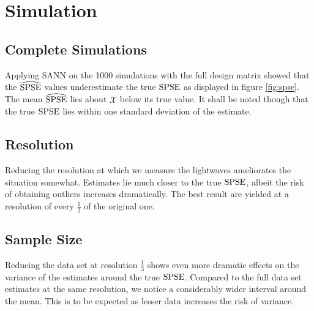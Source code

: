 \section{Simulation}
\label{sec:simulation}
	
	
	
	\subsection{Complete Simulations}
	\label{ssec:comp-sim}
	
		Applying SANN on the 1000 simulations with the full design matrix showed that the $\widehat{\mathrm{SPSE}}$ values underestimate the true $\mathrm{SPSE}$ as displayed in figure \ref{fig:spse}.
		The mean $\widehat{\mathrm{SPSE}}$ lies about $\mathcal{X}$ below its true value.
		It shall be noted though that the true $\mathrm{SPSE}$ lies within one standard deviation of the estimate.
	
	
	\subsection{Resolution}
	\label{ssec:resolution}
	
		Reducing the resolution at which we measure the lightwaves ameliorates the situation somewhat.
		Estimates lie much closer to the true $\mathrm{SPSE}$, albeit the risk of obtaining outliers increases dramatically.
		The best result are yielded at a resolution of every $\frac{1}{2}$ of the original one.
	
	
	\subsection{Sample Size}
	\label{ssec:samp-size}
	
		Reducing the data set at resolution $\frac{1}{3}$ shows even more dramatic effects on the variance of the estimates around the true $\mathrm{SPSE}$.
		Compared to the full data set estimates at the same resolution, we notice a considerably wider interval around the mean.
		This is to be expected as lesser data increases the risk of variance.
	

